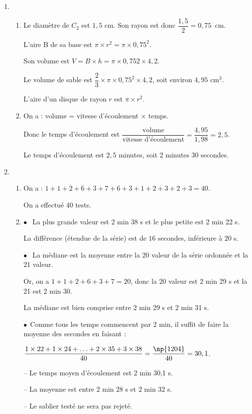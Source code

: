 
\medskip

\begin{enumerate}
\item 
	\begin{enumerate}
		\item Le diamètre de $C_2$ est $1,5$ cm. Son rayon est donc $\dfrac{1,5}{2} = 0,75 $~cm.
		
L'aire B de sa base est $\pi \times r^2 = \pi \times  0,75^2$.

Son volume est $V = B \times h = \pi \times 0,752 \times 4,2$.

Le volume de sable est $\dfrac{2}{3}\times \pi \times 0,75^2 \times 4,2$, soit environ $4,95$ cm$^3$.

L'aire d'un disque de rayon $r$ est $\pi \times r^2$.
		\item  On a : volume = vitesse d'écoulement $\times$ temps.
		
Donc le temps d'écoulement est  $\dfrac{\text{volume}}{\text{vitesse d'écoulement}}= \dfrac{4,95}{1,98} = 2,5$.

Le temps d'écoulement est $2,5$ minutes, soit 2 minutes 30 secondes.
	\end{enumerate}
\item 
	\begin{enumerate}
		\item On a : $1 + 1 + 2 + 6 + 3 + 7 + 6 + 3 + 1 + 2 + 3 + 2 + 3 = 40$.
		
On a effectué 40 tests.
		\item  
		
$\bullet~~$ La plus grande valeur est 2 min 38 s et le plus petite est 2 min 22 s.

La différence (étendue de la série) est de $16$ secondes, inférieure à $20$ s.

$\bullet~~$ La médiane est la moyenne entre la 20 valeur de la série ordonnée et la 21 valeur.

Or, on a $1 + 1 + 2 + 6 + 3 + 7 = 20$, donc la 20 valeur est 2 min 29 s et la 21 est 2 min 30. 

La médiane est bien comprise entre 2 min 29 s et 2 min 31 s.

$\bullet~~$Comme tous les temps commencent par 2 min, il suffit de faire la moyenne des secondes en faisant :

$\dfrac{1 \times 22 + 1 \times 24 + \ldots  + 2 \times 35 + 3 \times 38}{40} = \dfrac{\np{1204}}{40}  = 30,1$.

-- Le temps moyen d'écoulement est 2 min 30,1 s.

-- La moyenne est entre 2 min 28 s et 2 min 32 s.

-- Le sablier testé ne sera pas rejeté.
	\end{enumerate}
\end{enumerate}
\bigskip

